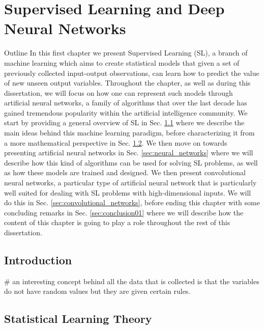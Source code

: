 \chapter{Supervised Learning and Deep Neural Networks}
\label{ch:supervised_learning}

\begin{remark}{Outline}
	In this first chapter we present Supervised Learning (SL), a branch of machine learning which aims to create statistical models that given a set of previously collected input-output observations, can learn how to predict the value of new unseen output variables. Throughout the chapter, as well as during this dissertation, we will focus on how one can represent such models through artificial neural networks, a family of algorithms that over the last decade has gained tremendous popularity within the artificial intelligence community. We start by providing a general overview of SL in Sec. \ref{sec:introduction01} where we describe the main ideas behind this machine learning paradigm, before characterizing it from a more mathematical perspective in Sec. \ref{sec:learning_from_data}. We then move on towards presenting artificial neural networks in Sec. \ref{sec:neural_networks} where we will describe how this kind of algorithms can be used for solving SL problems, as well as how these models are trained and designed. We then present convolutional neural networks, a particular type of artificial neural network that is particularly well suited for dealing with SL problems with high-dimensional inputs. We will do this in Sec. \ref{sec:convolutional_networks}, before ending this chapter with some concluding remarks in Sec. \ref{sec:conclusion01} where we will describe how the content of this chapter is going to play a role throughout the rest of this dissertation.   
\end{remark}

\section{Introduction}
\label{sec:introduction01}

# an interesting concept behind all the data that is collected is that the variables do not have random values but they are given certain rules. 


\section{Statistical Learning Theory}
\label{sec:learning_from_data}


